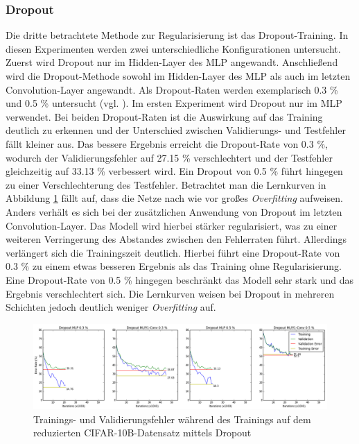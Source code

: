 \subsubsection{Dropout}
Die dritte betrachtete Methode zur Regularisierung ist das Dropout-Training. In diesen Experimenten werden zwei unterschiedliche Konfigurationen untersucht. Zuerst wird Dropout nur im Hidden-Layer des MLP angewandt. Anschließend wird die Dropout-Methode sowohl im Hidden-Layer des MLP als auch im letzten Convolution-Layer angewandt.
Als Dropout-Raten werden exemplarisch 0.3 \% und 0.5 \% untersucht (vgl. \cite{Srivastava2014}).
Im ersten Experiment wird Dropout nur im MLP verwendet. Bei beiden Dropout-Raten ist die Auswirkung auf das Training deutlich zu erkennen und der Unterschied zwischen Validierungs- und Testfehler fällt kleiner aus. Das bessere Ergebnis erreicht die Dropout-Rate von 0.3 \%, wodurch der Validierungsfehler auf 27.15 \% verschlechtert und der Testfehler gleichzeitig auf 33.13 \% verbessert wird. Ein Dropout von 0.5 \% führt hingegen zu einer Verschlechterung des Testfehler. Betrachtet man die Lernkurven in Abbildung \ref{fig:6_overfit_dropout} fällt auf, dass die Netze nach wie vor großes \textit{Overfitting} aufweisen.
Anders verhält es sich bei der zusätzlichen Anwendung von Dropout im letzten Convolution-Layer. Das Modell wird hierbei stärker regularisiert, was zu einer weiteren Verringerung des Abstandes zwischen den Fehlerraten führt. Allerdings verlängert sich die Trainingszeit deutlich. Hierbei führt eine Dropout-Rate von 0.3 \% zu einem etwas besseren Ergebnis als das Training ohne Regularisierung. Eine Dropout-Rate von 0.5 \% hingegen beschränkt das Modell sehr stark und das Ergebnis verschlechtert sich. Die Lernkurven weisen bei Dropout in mehreren Schichten jedoch deutlich weniger \textit{Overfitting} auf.

\begin{figure}
\centering
\includegraphics[width=1.0\linewidth]{images/6_overfit_dropout_2}
\caption[]{Trainings- und Validierungsfehler während des Trainings auf dem reduzierten CIFAR-10B-Datensatz mittels Dropout}
\label{fig:6_overfit_dropout}
\end{figure}

